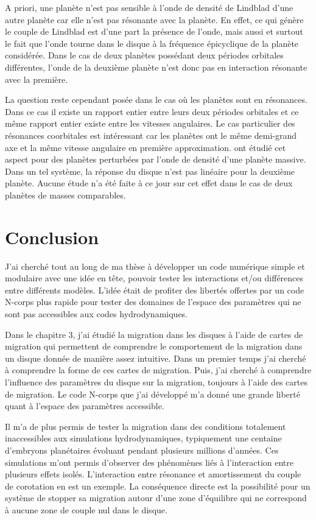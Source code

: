 A priori, une planète n'est pas sensible à l'onde de densité de Lindblad d'une autre planète car elle n'est pas résonante avec la planète. En effet, ce qui génère le couple de Lindblad est d'une part la présence de l'onde, mais aussi et surtout le fait que l'onde tourne dans le disque à la fréquence épicyclique de la planète considérée. Dans le cas de deux planètes possédant deux périodes orbitales différentes, l'onde de la deuxième planète n'est donc pas en interaction résonante avec la première. 

La question reste cependant posée dans le cas où les planètes sont en résonances. Dans ce cas il existe un rapport entier entre leurs deux périodes orbitales et ce même rapport entier existe entre les vitesses angulaires. Le cas particulier des résonances coorbitales est intéressant car les planètes ont le même demi-grand axe et la même vitesse angulaire en première approximation. \cite{podlewska2012outward, baruteau2013disk} ont étudié cet aspect pour des planètes perturbées par l'onde de densité d'une planète massive. Dans un tel système, la réponse du disque n'est pas linéaire pour la deuxième planète. Aucune étude n'a été faite à ce jour sur cet effet dans le cas de deux planètes de masses comparables.  

\section{Conclusion}
J'ai cherché tout au long de ma thèse à développer un code numérique simple et modulaire avec une idée en tête, pouvoir tester les interactions et/ou différences entre différents modèles. L'idée était de profiter des libertés offertes par un code N-corps plus rapide pour tester des domaines de l'espace des paramètres qui ne sont pas accessibles aux codes hydrodynamiques. 

\bigskip

Dans le chapitre 3, j'ai étudié la migration dans les disques à l'aide de cartes de migration qui permettent de comprendre le comportement de la migration dans un disque donnée de manière assez intuitive. Dans un premier temps j'ai cherché à comprendre la forme de ces cartes de migration. Puis, j'ai cherché à comprendre l'influence des paramètres du disque sur la migration, toujours à l'aide des cartes de migration. Le code N-corps que j'ai développé m'a donné une grande liberté quant à l'espace des paramètres accessible. 

Il m'a de plus permis de tester la migration dans des conditions totalement inaccessibles aux simulations hydrodynamiques, typiquement une centaine d'embryons planétaires évoluant pendant plusieurs millions d'années. Ces simulations m'ont permis d'observer des phénomènes liés à l'interaction entre plusieurs effets isolés. L'interaction entre résonance et amortissement du couple de corotation en est un exemple. La conséquence directe est la possibilité pour un système de stopper sa migration autour d'une zone d'équilibre qui ne correspond à aucune zone de couple nul dans le disque. 

